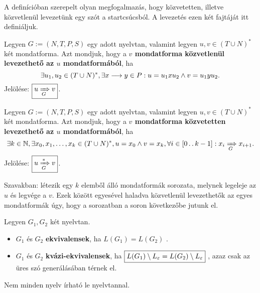 A definícióban szerepelt olyan megfogalmazás, hogy közvetetten, illetve közvetlenül levezetünk egy szót a startcsúcsból. A levezetés ezen két fajtáját itt definiáljuk.

\begin{tcolorbox}
	\begin{definition}
		Legyen $G := (N,T,P,S)$ egy adott nyelvtan, valamint legyen $u,v \in (T\cup N)^*$ két mondatforma. Azt mondjuk, hogy a \textbf{$v$ mondatforma közvetlenül levezethető az $u$ mondatformából}, ha 
		\[ \exists u_1, u_2 \in (T\cup N)^*, \exists x \longrightarrow y \in P : u = u_1 x u_2 \land v = u_1 y u_2. \] Jelölése: $\boxed{u \xRightarrow[{G}]{} v}$.
	\end{definition}
\end{tcolorbox}

\begin{tcolorbox}
	\begin{definition}
		Legyen $G := (N,T,P,S)$ egy adott nyelvtan, valamint legyen $u,v \in (T\cup N)^*$ két mondatforma. Azt mondjuk, hogy a \textbf{$v$ mondatforma közvetetten levezethető az $u$ mondatformából}, ha 
		\[ \exists k \in \mathbb{N}, \exists x_0, x_1, \dots, x_k \in (T\cup N)^*, u = x_0 \land v = x_k, \forall i \in [0 \operatorname{..} k-1]: x_{i} \xRightarrow[{G}]{} x_{i+1}. \] Jelölése: $\boxed{u \xRightarrow[{G}]{*} v}$.
	\end{definition}
\end{tcolorbox}

Szavakban: létezik egy $k$ elemből álló mondatformák sorozata, melynek legeleje az $u$ és legvége a $v$. Ezek között egyesével haladva közvetlenül levezethetők az egyes mondatformák úgy, hogy a sorozatban a soron következőbe jutunk el.

\begin{tcolorbox}
	\begin{definition}
		Legyen $G_1, G_2$ két nyelvtan.
		\begin{itemize}
			\item $G_1$ és $G_2$ \textbf{ekvivalensek}, ha $\boxed{L(G_1) = L(G_2)}$ .
			\item $G_1$ és $G_2$ \textbf{kvázi-ekvivalensek}, ha $\boxed{L(G_1) \setminus L_\varepsilon = L(G_2) \setminus L_\varepsilon}$ , azaz csak az üres szó generálásában térnek el.
		\end{itemize}
	\end{definition}
\end{tcolorbox}

\begin{tcolorbox}
	\begin{theorem}
		Nem minden nyelv írható le nyelvtannal.
	\end{theorem}
\end{tcolorbox}

